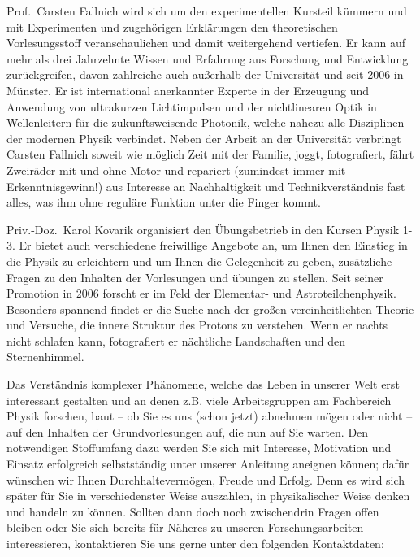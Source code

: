 \begin{multicols}{2}

Prof.\ Carsten Fallnich wird sich um den experimentellen Kursteil kümmern und mit Experimenten und zugehörigen Erklärungen den theoretischen Vorlesungsstoff veranschaulichen und damit weitergehend vertiefen. Er kann auf mehr als drei Jahrzehnte Wissen und Erfahrung aus Forschung und Entwicklung zurückgreifen, davon zahlreiche auch außerhalb der Universität und seit 2006 in Münster. Er ist international anerkannter Experte in der Erzeugung und Anwendung von ultrakurzen Lichtimpulsen und der nichtlinearen Optik in Wellenleitern für die zukunftsweisende Photonik, welche nahezu alle Disziplinen der modernen Physik verbindet. Neben der Arbeit an der Universität verbringt Carsten Fallnich soweit wie möglich Zeit mit der Familie, joggt, fotografiert, fährt Zweiräder mit und ohne Motor und repariert (zumindest immer mit Erkenntnisgewinn!) aus Interesse an Nachhaltigkeit und Technikverständnis fast alles, was ihm ohne reguläre Funktion unter die Finger kommt.

Priv.-Doz.~Karol Kovarik organisiert den Übungsbetrieb in den Kursen Physik 1-3. Er bietet auch verschiedene freiwillige Angebote an, um Ihnen den Einstieg in die Physik zu erleichtern und um Ihnen die Gelegenheit zu geben, zusätzliche Fragen zu den Inhalten der Vorlesungen und übungen zu stellen. Seit seiner Promotion in 2006 forscht er im Feld der Elementar- und Astroteilchenphysik. Besonders spannend findet er die Suche nach der gro{\ss}en vereinheitlichten Theorie und Versuche, die innere Struktur des Protons zu verstehen. Wenn er nachts nicht schlafen kann, fotografiert er nächtliche Landschaften und den Sternenhimmel.

Das Verständnis komplexer Phänomene, welche das Leben in unserer Welt erst interessant gestalten und an denen z.B. viele  Arbeitsgruppen am Fachbereich Physik forschen, baut -- ob Sie es uns (schon jetzt) abnehmen mögen oder nicht -- auf den Inhalten der Grundvorlesungen auf, die nun auf Sie warten. Den notwendigen Stoffumfang dazu werden Sie sich mit Interesse, Motivation und Einsatz erfolgreich selbstständig unter unserer Anleitung aneignen können; dafür wünschen wir Ihnen Durchhaltevermögen, Freude und Erfolg. Denn es wird sich später für Sie in verschiedenster Weise auszahlen, in physikalischer Weise denken und handeln zu können. Sollten dann doch noch zwischendrin Fragen offen bleiben oder Sie sich bereits für Näheres zu unseren Forschungsarbeiten interessieren, kontaktieren Sie uns gerne unter den folgenden Kontaktdaten:\\


\end{multicols}
